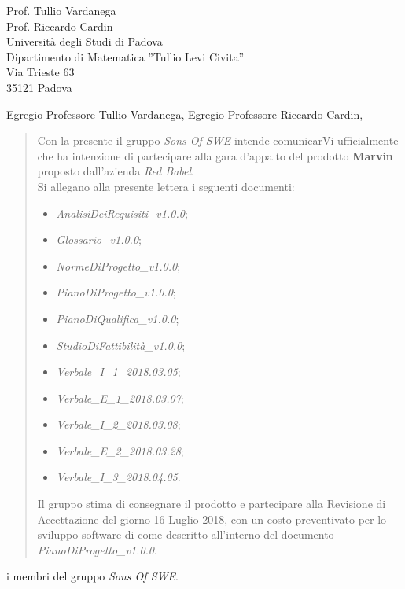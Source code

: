 \documentclass{letter}
\newcommand{\gruppo}{\emph{Sons Of SWE}}
\newcommand{\AdR}{\emph{AnalisiDeiRequisiti\_v1.0.0}}
\newcommand{\SdF}{\emph{StudioDiFattibilità\_v1.0.0}}
\newcommand{\NdP}{\emph{NormeDiProgetto\_v1.0.0}}
\newcommand{\PdP}{\emph{PianoDiProgetto\_v1.0.0}}
\newcommand{\PdQ}{\emph{PianoDiQualifica\_v1.0.0}}
\newcommand{\G}{\emph{Glossario\_v1.0.0}}
\newcommand{\VIuno}{\emph{Verbale\_I\_1\_2018.03.05}}
\newcommand{\VEuno}{\emph{Verbale\_E\_1\_2018.03.07}}
\newcommand{\VIdue}{\emph{Verbale\_I\_2\_2018.03.08}}
\newcommand{\VEdue}{\emph{Verbale\_E\_2\_2018.03.28}}
\newcommand{\VItre}{\emph{Verbale\_I\_3\_2018.04.05}}
\begin{document}
	
\begin{letter} {   
	\hfill Prof. Tullio Vardanega\\
	\hfill Prof. Riccardo Cardin\\
	\hfill Università degli Studi di Padova \\
	\hfill Dipartimento di Matematica ''Tullio Levi Civita'' \\
	\hfill Via Trieste 63 \\
	\hfill 35121 Padova \\
}

\date{}
\opening{Egregio Professore Tullio Vardanega, \newline Egregio Professore Riccardo Cardin,}
	\begin{quotation}
		\noindent Con la presente il gruppo \textit{\gruppo} intende comunicarVi ufficialmente che ha intenzione di partecipare alla gara d'appalto del prodotto \textbf{Marvin} proposto dall'azienda \textit{Red Babel}.\\
		Si allegano alla presente lettera i seguenti documenti:
		\begin{itemize}
			\item \AdR{};
			\item \G{};
			\item \NdP{};
			\item \PdP{};
			\item \PdQ{};
			\item \SdF{};
			\item \VIuno{};
			\item \VEuno{};
			\item \VIdue{};
			\item \VEdue{};
			\item \VItre{}.
		\end{itemize}
		Il gruppo stima di consegnare il prodotto e partecipare alla Revisione di Accettazione del giorno 16 Luglio 2018, con un costo preventivato per lo sviluppo software di  come descritto all’interno del documento \PdP{}.
	\end{quotation}
{
	\setlength\parindent{24pt}
	\indent i membri del gruppo \gruppo.
}
\end{letter}
\end{document}
